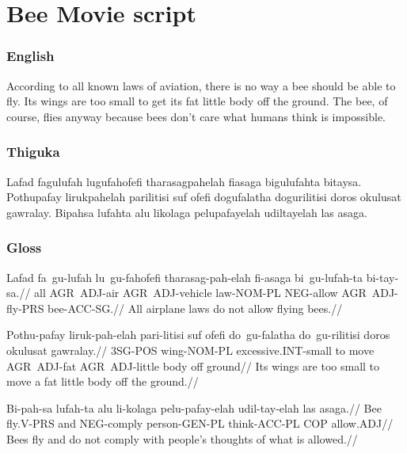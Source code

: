 
\chapter{Bee Movie script}

\subsection*{English}
According to all known laws of aviation, there is no way a bee should be able to fly.
Its wings are too small to get its fat little body off the ground.
The bee, of course, flies anyway because bees don't care what humans think is impossible.

\subsection*{Thiguka}
Lafad fagulufah lugufahofefi tharasagpahelah fiasaga bigulufahta bitaysa.
Pothupafay lirukpahelah parilitisi suf ofefi dogufalatha dogurilitisi doros okulusat gawralay.
Bipahsa lufahta alu likolaga pelupafayelah udiltayelah las asaga.

\subsection*{Gloss}
\ex
\begingl
\gla  Lafad fa~gu-lufah lu~gu-fahofefi tharasag-pah-elah fi-asaga bi~gu-lufah-ta bi-tay-sa.//
\glb  all AGR~ADJ-air AGR~ADJ-vehicle law-NOM-PL NEG-allow AGR~ADJ-fly-PRS bee-ACC-SG.//
\glft All airplane laws do not allow flying bees.//
\endgl
\xe

\ex
\begingl
\gla  Pothu-pafay liruk-pah-elah  pari-litisi suf ofefi  do~gu-falatha do~gu-rilitisi doros okulusat gawralay.//
\glb  3SG-POS wing-NOM-PL  excessive.INT-small to move  AGR~ADJ-fat AGR~ADJ-little body off ground//
\glft Its wings are too small to move a fat little body off the ground.//
\endgl
\xe

\ex
\begingl
\gla  Bi-pah-sa lufah-ta alu li-kolaga pelu-pafay-elah udil-tay-elah las asaga.//
\glb  Bee fly.V-PRS and NEG-comply person-GEN-PL think-ACC-PL COP allow.ADJ//
\glft Bees fly and do not comply with people's thoughts of what is allowed.//
\endgl
\xe


